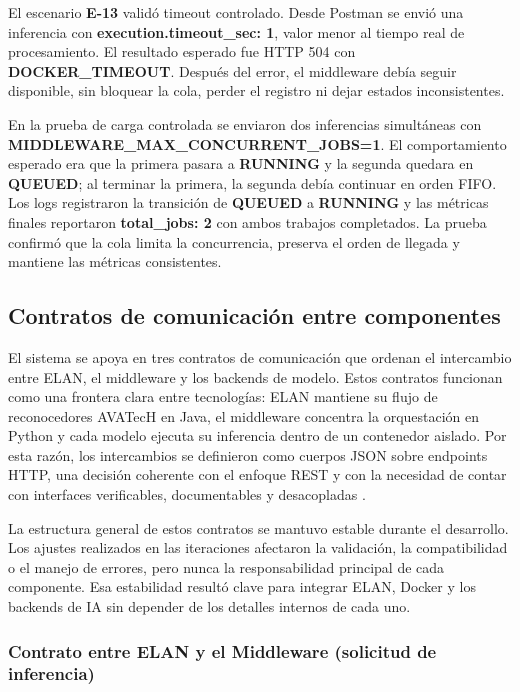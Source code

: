 El escenario \textbf{E-13} validó timeout controlado. Desde Postman se envió una inferencia con \textbf{execution.timeout\_sec: 1}, valor menor al tiempo real de procesamiento. El resultado esperado fue HTTP 504 con \textbf{DOCKER\_TIMEOUT}. Después del error, el middleware debía seguir disponible, sin bloquear la cola, perder el registro ni dejar estados inconsistentes.

En la prueba de carga controlada se enviaron dos inferencias simultáneas con \textbf{MIDDLEWARE\_MAX\_CONCURRENT\_JOBS=1}. El comportamiento esperado era que la primera pasara a \textbf{RUNNING} y la segunda quedara en \textbf{QUEUED}; al terminar la primera, la segunda debía continuar en orden FIFO. Los logs registraron la transición de \textbf{QUEUED} a \textbf{RUNNING} y las métricas finales reportaron \textbf{total\_jobs: 2} con ambos trabajos completados. La prueba confirmó que la cola limita la concurrencia, preserva el orden de llegada y mantiene las métricas consistentes.


\subsection{Contratos de comunicación entre componentes}

El sistema se apoya en tres contratos de comunicación que ordenan el intercambio entre ELAN, el middleware y los backends de modelo. Estos contratos funcionan como una frontera clara entre tecnologías: ELAN mantiene su flujo de reconocedores AVATecH en Java, el middleware concentra la orquestación en Python y cada modelo ejecuta su inferencia dentro de un contenedor aislado. Por esta razón, los intercambios se definieron como cuerpos JSON sobre endpoints HTTP, una decisión coherente con el enfoque REST y con la necesidad de contar con interfaces verificables, documentables y desacopladas \cite{fielding2000rest}.

La estructura general de estos contratos se mantuvo estable durante el desarrollo. Los ajustes realizados en las iteraciones afectaron la validación, la compatibilidad o el manejo de errores, pero nunca la responsabilidad principal de cada componente. Esa estabilidad resultó clave para integrar ELAN, Docker y los backends de IA sin depender de los detalles internos de cada uno.

\subsubsection{Contrato entre ELAN y el Middleware (solicitud de inferencia)}


